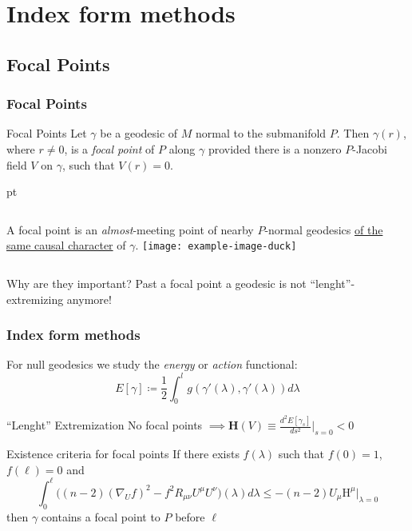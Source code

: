 \documentclass[handout]{beamer}
\begin{document}
	\section{Index form methods}
	\subsection{Focal Points}
	\begin{frame}
		\frametitle{Focal Points}
		\begin{defblock}{Focal Points}
			Let \(\gamma\) be a geodesic of \(M\) normal to the submanifold \(P\). Then \(\gamma(r)\), where \(r \neq 0\), is a \emph{focal point} of \(P\) along \(\gamma\) provided there is a nonzero \(P\)-Jacobi field \(V\) on \(\gamma\), such that \(V(r) = 0\).
		\end{defblock}
		 pt
		\begin{columns}
			A focal point is an \emph{almost}-meeting point of nearby \(P\)-normal geodesics \underline{of the same causal character} of \(\gamma\).
			\centering
			\texttt{[image: example-image-duck]}
		\end{columns}

		\begin{ideablock}{Why are they important?}
			\centering
			Past a focal point a geodesic is not ``lenght''-extremizing anymore!
		\end{ideablock}
	\end{frame}

	\begin{frame}
		\frametitle{Index form methods}
		For null geodesics we study the \emph{energy} or \emph{action} functional:
		\[
			E[\gamma] \coloneqq \frac{1}{2}\int_{0}^{l} g(\gamma'(\lambda), \gamma'(\lambda))d\lambda	
		\]
		\begin{ideablock}{``Lenght'' Extremization}
			\centering
			No focal points \(\implies \textbf{H}(V) \equiv\frac{d^2E[\gamma_s]}{ds^2}\Big\vert_{s = 0} < 0\)
		\end{ideablock}
	
		\begin{theoblock}{Existence criteria for focal points}
			If there exists \(f(\lambda)\) such that \(f(0) = 1\), \(f(\ell) = 0\) and
			\[
				\int_{0}^{\ell} \big((n -2)(\nabla_Uf)^2 - f^2R_{\mu\nu}U^{\mu}U^{\nu} \big)(\lambda) d\lambda\le -(n-2)U_{\mu}\mathrm{H}^{\mu}\Big\vert_{\lambda = 0}	
			\]
			then \(\gamma\) contains a focal point to \(P\) before \(\ell\)
		\end{theoblock}
	\end{frame}
\end{document}
